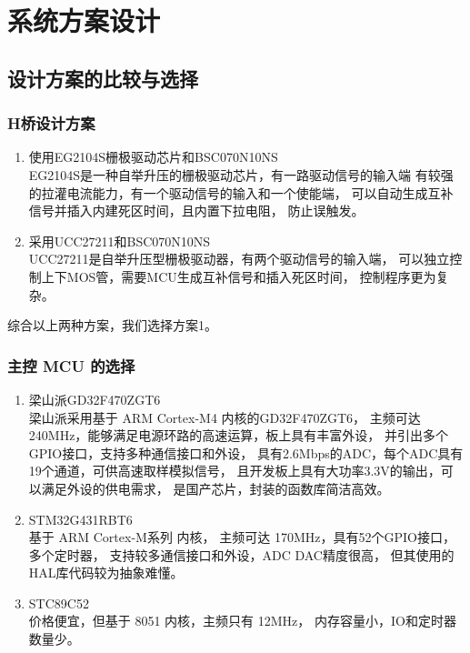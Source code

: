 \documentclass[a4paper,12pt]{article}
\begin{document}
\section{系统方案设计}
\subsection{设计方案的比较与选择}

\subsubsection{H桥设计方案}
\begin{enumerate}
    \item 使用EG2104S栅极驱动芯片和BSC070N10NS
    \\ 
    EG2104S是一种自举升压的栅极驱动芯片，有一路驱动信号的输入端
    有较强的拉灌电流能力，有一个驱动信号的输入和一个使能端，
    可以自动生成互补信号并插入内建死区时间，且内置下拉电阻，
    防止误触发。
    \item 采用UCC27211和BSC070N10NS
    \\ 
    UCC27211是自举升压型栅极驱动器，有两个驱动信号的输入端，
    可以独立控制上下MOS管，需要MCU生成互补信号和插入死区时间，
    控制程序更为复杂。
\end{enumerate}


综合以上两种方案，我们选择方案1。

\subsubsection{主控 MCU 的选择}
\begin{enumerate}
    \item 梁山派GD32F470ZGT6 
    \\
    梁山派采用基于 ARM Cortex-M4 内核的GD32F470ZGT6，
    主频可达240MHz，能够满足电源环路的高速运算，板上具有丰富外设，
    并引出多个GPIO接口，支持多种通信接口和外设，
    具有2.6Mbps的ADC，每个ADC具有19个通道，可供高速取样模拟信号，
    且开发板上具有大功率3.3V的输出，可以满足外设的供电需求，
    是国产芯片，封装的函数库简洁高效。
    \item STM32G431RBT6 
    \\ 
    基于 ARM Cortex-M系列 内核，
    主频可达 170MHz，具有52个GPIO接口，多个定时器，
    支持较多通信接口和外设，ADC DAC精度很高，
    但其使用的HAL库代码较为抽象难懂。    
    \item STC89C52 
    \\ 
    价格便宜，但基于 8051 内核，主频只有 12MHz，
    内存容量小，IO和定时器数量少。
\end{enumerate}
\end{document}
